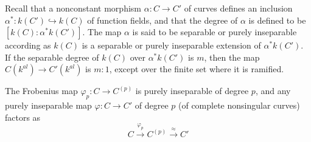 \documentclass[11pt]{article}
\begin{document}
 Recall that a nonconstant morphism $\alpha: C\rightarrow C'$ of curves defines an inclusion $\alpha^*: k(C')\hookrightarrow k(C)$
 of function fields, and that the degree of $\alpha$ is defined to be $[k(C):\alpha^*k(C')]$. The map $\alpha$ is said to be separable
 or purely inseparable according as $k(C)$ is a separable or purely inseparable extension of $\alpha^*k(C')$. If the separable degree 
 of $k(C)$ over $\alpha^*k(C')$ is $m$, then the map $C(k^{al})\rightarrow C'(k^{al})$ is $m:1$, except over the finite set where 
 it is ramified.
 \begin{proposition}
    The Frobenius map $\varphi_p: C\rightarrow C^{(p)}$ is purely inseparable of degree $p$, and any purely inseparable map 
    $\varphi: C\rightarrow C'$ of degree $p$ (of complete nonsingular curves) factors as 
    \begin{equation*}
        C\stackrel{\varphi_p}{\longrightarrow}C^{(p)}\stackrel{\approx }{\longrightarrow} C'
    \end{equation*}
    \label{Thm:Frobenius_map}
 \end{proposition}
\end{document}
